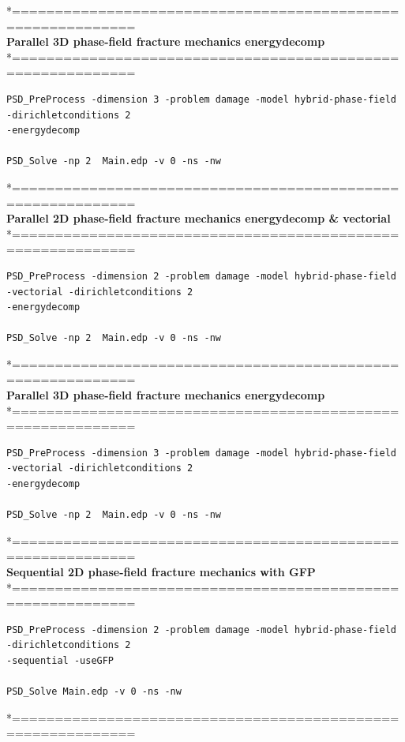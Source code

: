 *============================================================\\
\textbf{ Parallel 3D phase-field fracture mechanics energydecomp }\\
*============================================================\\
\begin{lstlisting}[style=Linux]
PSD_PreProcess -dimension 3 -problem damage -model hybrid-phase-field -dirichletconditions 2 
-energydecomp   

PSD_Solve -np 2  Main.edp -v 0 -ns -nw   
\end{lstlisting}
*============================================================\\
\textbf{ Parallel 2D phase-field fracture mechanics energydecomp \& vectorial}\\
*============================================================\\
\begin{lstlisting}[style=Linux]
PSD_PreProcess -dimension 2 -problem damage -model hybrid-phase-field -vectorial -dirichletconditions 2 
-energydecomp   

PSD_Solve -np 2  Main.edp -v 0 -ns -nw   
\end{lstlisting}
*============================================================\\
\textbf{ Parallel 3D phase-field fracture mechanics energydecomp }\\
*============================================================\\
\begin{lstlisting}[style=Linux]
PSD_PreProcess -dimension 3 -problem damage -model hybrid-phase-field -vectorial -dirichletconditions 2 
-energydecomp   

PSD_Solve -np 2  Main.edp -v 0 -ns -nw   
\end{lstlisting}
*============================================================\\
\textbf{ Sequential 2D phase-field fracture mechanics with GFP }\\
*============================================================\\
\begin{lstlisting}[style=Linux]
PSD_PreProcess -dimension 2 -problem damage -model hybrid-phase-field  -dirichletconditions 2 
-sequential -useGFP   

PSD_Solve Main.edp -v 0 -ns -nw   
\end{lstlisting}
*============================================================\\
